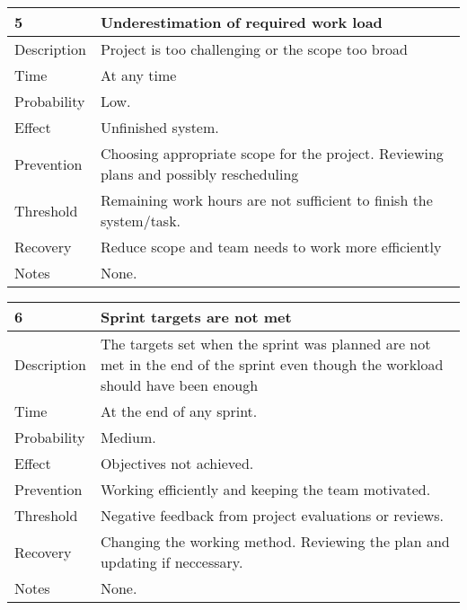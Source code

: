 \documentclass[12pt,titlepage,a4paper]{article}
\begin{document}
		\begin{center}
		\begin{tabular}{|l|p{10cm}|}
			\hline
			\textbf{5} & \textbf{Underestimation of required work load} \\
			\hline
			\hline
			Description & Project is too challenging or the scope too broad\\
			\hline
			Time & At any time \\
			\hline
			Probability & Low. \\
			\hline
			Effect & Unfinished system. \\
			\hline
			Prevention & Choosing appropriate scope for the project. Reviewing plans and possibly rescheduling \\
			\hline
			Threshold & Remaining work hours are not sufficient to finish the system/task. \\
			\hline
			Recovery & Reduce scope and team needs to work more efficiently \\
			\hline
			Notes & None. \\
			\hline
		\end{tabular}
		\end{center}

		\begin{center}
		\begin{tabular}{|l|p{10cm}|}
			\hline
			\textbf{6} & \textbf{Sprint targets are not met} \\
			\hline
			\hline
			Description & The targets set when the sprint was planned are not met in the end of the sprint even though the 				workload should have been enough\\
			\hline
			Time & At the end of any sprint. \\
			\hline
			Probability & Medium. \\
			\hline
			Effect & Objectives not achieved. \\
			\hline
			Prevention & Working efficiently and keeping the team motivated. \\
			\hline
			Threshold & Negative feedback from project evaluations or reviews. \\
			\hline
			Recovery & Changing the working method. Reviewing the plan and updating if neccessary. \\
			\hline
			Notes & None. \\
			\hline
		\end{tabular}
		\end{center}
		
		
\end{document}
